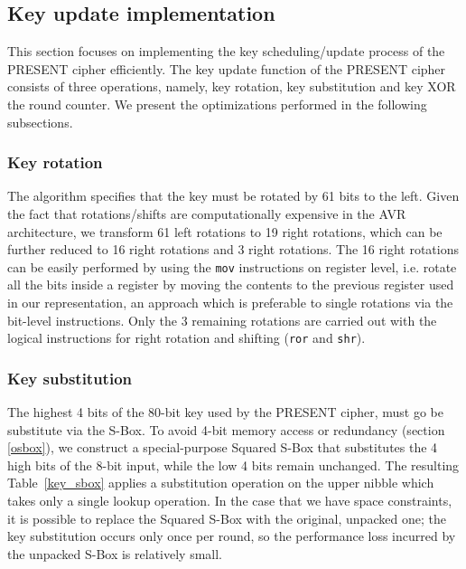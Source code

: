 \documentclass[11pt]{article}
\begin{document}
\subsection{Key update implementation}
This section focuses on implementing the key scheduling/update process of the PRESENT cipher efficiently. The key update function of the PRESENT cipher consists of three operations, namely, key rotation, key substitution and key XOR the round counter. We present the optimizations performed in the following subsections.
\subsubsection{Key rotation}
The algorithm specifies that the key must be rotated by 61 bits to the left. Given the fact that rotations/shifts are computationally expensive in the AVR architecture, we transform 61 left rotations to 19 right rotations, which can be further reduced to 16 right rotations and 3 right rotations. The 16 right rotations can be easily performed by using the \texttt{mov} instructions on register level, i.e. rotate all the bits inside a register by moving the contents to the previous register used in our representation, an approach which is preferable to single rotations via the bit-level instructions. Only the 3 remaining rotations are carried out with the logical instructions for right rotation and shifting (\texttt{ror} and \texttt{shr}).
\subsubsection{Key substitution}
The highest 4 bits of the 80-bit key used by the PRESENT cipher, must go be substitute via the S-Box. To avoid 4-bit memory access or redundancy (section \ref{osbox}), we construct a special-purpose Squared S-Box that substitutes the 4 high bits of the 8-bit input, while the low 4 bits remain unchanged. The resulting Table~\ref{key_sbox} applies a substitution operation on the upper nibble which takes only a single lookup operation. In the case that we have space constraints, it is possible to replace the Squared S-Box with the original, unpacked one; the key substitution occurs only once per round, so the performance loss incurred by the unpacked S-Box is relatively small. 
\end{document}
